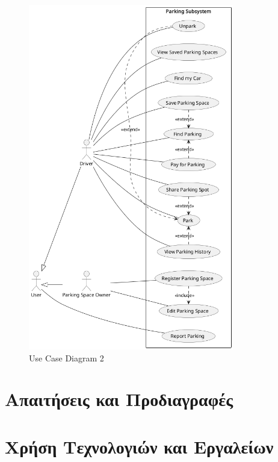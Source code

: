 \documentclass[11pt]{article}
\begin{document}
\begin{figure}
    \centering
    \includegraphics[width=0.8\textwidth]{use-cases-parking}
    \caption{Use Case Diagram 2}
\end{figure}

\section{Απαιτήσεις και Προδιαγραφές}

\section{Χρήση Τεχνολογιών και Εργαλείων}
\end{document}
